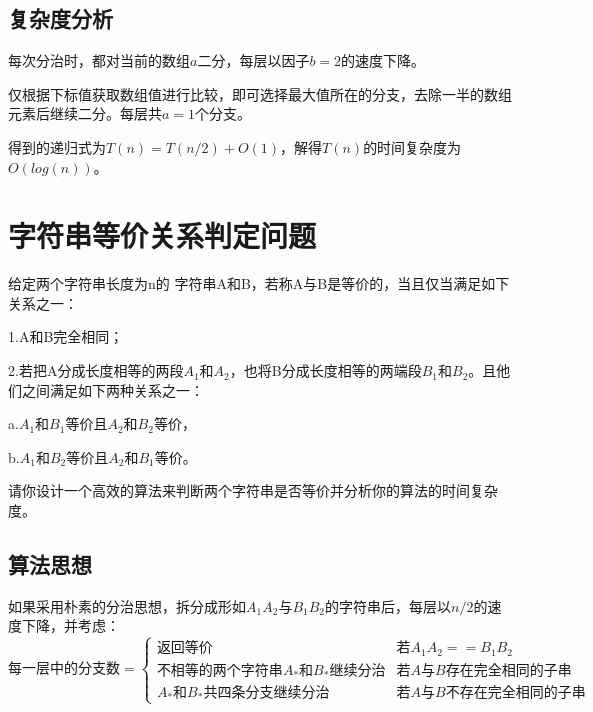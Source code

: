 \documentclass{article}
\begin{document}
\subsection{复杂度分析}
每次分治时，都对当前的数组$a$二分，每层以因子$b=2$的速度下降。

仅根据下标值获取数组值进行比较，即可选择最大值所在的分支，去除一半的数组元素后继续二分。每层共$a=1$个分支。

得到的递归式为$T(n)=T(n/2)+O(1)$，解得$T(n)$的时间复杂度为$O(log(n))$。






\section{字符串等价关系判定问题}

给定两个字符串长度为n的 字符串A和B，若称A与B是等价的，当且仅当满足如下关系之一：\

	\noindent
{}
\setlength{\hangindent}{48pt}
\hspace{45pt}1.A和B完全相同；

\noindent
{}
\setlength{\hangindent}{48pt}
\hspace{45pt}2.若把A分成长度相等的两段$A_1$和$A_2$，也将B分成长度相等的两端段$B_1$和$B_2$。且他们之间满足如下两种关系之一：

\noindent
{}
\setlength{\hangindent}{96pt}
\hspace{90pt}a.$A_1$和$B_1$等价且$A_2$和$B_2$等价，

\noindent
{}
\setlength{\hangindent}{96pt}
\hspace{90pt}b.$A_1$和$B_2$等价且$A_2$和$B_1$等价。

请你设计一个高效的算法来判断两个字符串是否等价并分析你的算法的时间复杂度。

\subsection{算法思想}

如果采用朴素的分治思想，拆分成形如$A_1A_2$与$B_1B_2$​的字符串后，每层以$n/2$的速度下降，并考虑：$$\text{每一层中的分支数}=
\begin{cases}
\text{返回等价}& \text{若$A_1A_2==B_1B_2$}\\
\text{不相等的两个字符串$A_*$和$B_*$继续分治}& \text{若$A$与$B$存在完全相同的子串}\\
\text{$A_*$和$B_*$共四条分支继续分治}& \text{若$A$与$B$不存在完全相同的子串}
\end{cases}$$
\end{document}
